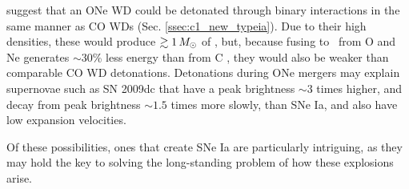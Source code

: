 \begin{itemize}
\cite{marq+15} suggest that an ONe WD could be detonated through binary interactions in the same manner as CO WDs (Sec. \ref{ssec:c1_new_typeia}).  Due to their high densities, these would produce $\gtrsim1\,\Msun$ of \Ni, but, because fusing to \Ni\ from O and Ne generates $\sim30$\% less energy than from C \citep{marq+15}, they would also be weaker than comparable CO WD detonations.  Detonations during ONe mergers may explain supernovae such as SN 2009dc \citep{taub+09} that have a peak brightness $\sim3$ times higher, and decay from peak brightness $\sim1.5$ times more slowly, than SNe Ia, and also have low expansion velocities.

\end{itemize}

Of these possibilities, ones that create SNe Ia are particularly intriguing, as they may hold the key to solving the long-standing problem of how these explosions arise.
